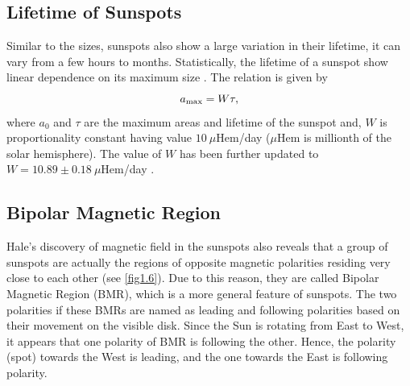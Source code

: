  \subsection{Lifetime of Sunspots}

Similar to the sizes, sunspots also show a large variation in their lifetime, it can vary from a few hours to months. Statistically, the lifetime of a sunspot show linear dependence on its maximum size \citep{Gnevyshev1938, Waldmeier1955}. The relation is given by
\begin{equation}
    a_{\rm max} = W\tau,
    \label{eq1.25}
\end{equation}
where $a_0$ and $\tau$ are the maximum areas and lifetime of the sunspot and, $W$ is proportionality constant having value $10~\mu$Hem/day ($\mu$Hem is millionth of the solar hemisphere). The value of $W$ has been further updated to $W=10.89\pm0.18~\mu$Hem/day \citep{Petrovay1997}.







\subsection{Bipolar Magnetic Region}
Hale's discovery of magnetic field in the sunspots \citep{Hale1908} also reveals that a group of sunspots are actually the regions of opposite magnetic polarities residing very close to each other (see \autoref{fig1.6}). Due to this reason, they are called Bipolar Magnetic Region (BMR), which is a more general feature of sunspots. The two polarities if these BMRs are named as leading and following polarities based on their movement on the visible disk. Since the Sun is rotating from East to West, it appears that one polarity of BMR is following the other. Hence, the polarity (spot) towards the West is leading, and the one towards the East is following polarity. 

